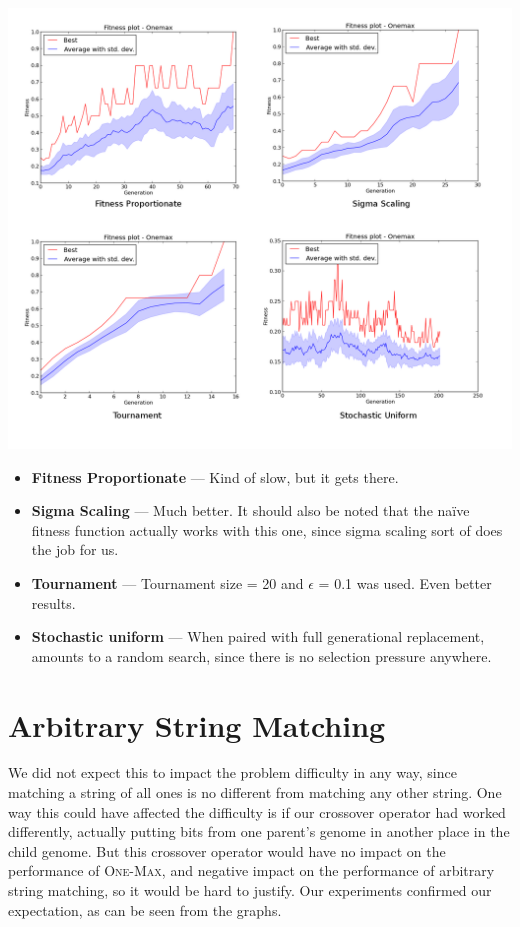 \documentclass[a4paper,12pt]{article}
\begin{document}
\centerline{\includegraphics[width=1.2\textwidth]{graph_bundle_2}}

\begin{itemize}
\item{\textbf{Fitness Proportionate} --- Kind of slow, but it gets there.}
\item{\textbf{Sigma Scaling} --- Much better. It should also be noted that the na\"{i}ve fitness function actually works with this one, since sigma scaling sort of does the job for us.}
\item{\textbf{Tournament} --- Tournament size = 20 and $\epsilon$ = 0.1 was used. Even better results.}
\item{\textbf{Stochastic uniform} --- When paired with full generational replacement, amounts to a random search, since there is no selection pressure anywhere.}
\end{itemize}

\section{Arbitrary String Matching}
We did not expect this to impact the problem difficulty in any way, since matching a string of all ones is no different from matching any other string. One way this could have affected the difficulty is if our crossover operator had worked differently, actually putting bits from one parent's genome in another place in the child genome. But this crossover operator would have no impact on the performance of \textsc{One-Max}, and negative impact on the performance of arbitrary string matching, so it would be hard to justify. Our experiments confirmed our expectation, as can be seen from the graphs.
\end{document}
